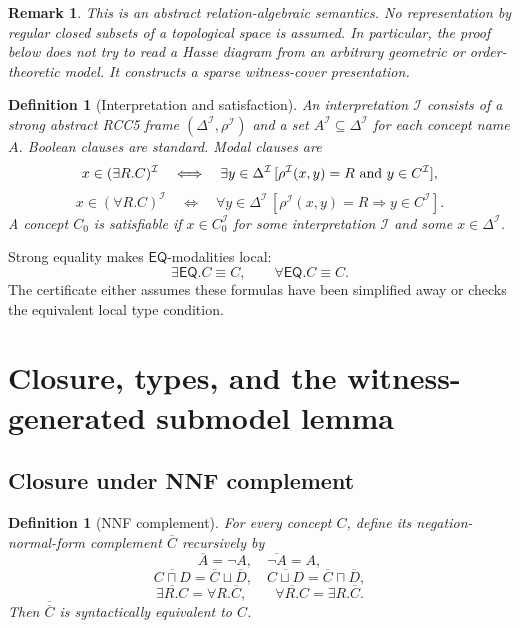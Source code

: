 \documentclass[11pt]{article}
\newtheorem{definition}[theorem]{Definition}
\newtheorem{remark}[theorem]{Remark}
\newcommand{\EQ}{\mathsf{EQ}}
\newcommand{\I}{\mathcal I}
\begin{document}
\begin{remark}
This is an abstract relation-algebraic semantics.  No representation by regular closed subsets of a topological space is assumed.  In particular, the proof below does not try to read a Hasse diagram from an arbitrary geometric or order-theoretic model.  It constructs a sparse witness-cover presentation.
\end{remark}

\begin{definition}[Interpretation and satisfaction]\label{def:satisfaction}
An interpretation $\I$ consists of a strong abstract RCC5 frame $(\Delta^\I,\rho^\I)$ and a set $A^\I\subseteq\Delta^\I$ for each concept name $A$.  Boolean clauses are standard.  Modal clauses are
\[
 x\in(\exists R.C)^\I
 \quad\Longleftrightarrow\quad
 \exists y\in\Delta^\I\,[\rho^\I(x,y)=R\hbox{ and }y\in C^\I],
\]
\[
 x\in(\forall R.C)^\I
 \quad\Longleftrightarrow\quad
 \forall y\in\Delta^\I\,[\rho^\I(x,y)=R\Rightarrow y\in C^\I].
\]
A concept $C_0$ is satisfiable if $x\in C_0^\I$ for some interpretation $\I$ and some $x\in\Delta^\I$.
\end{definition}

Strong equality makes $\EQ$-modalities local:
\[
  \exists\EQ.C\equiv C,
  \qquad
  \forall\EQ.C\equiv C.
\]
The certificate either assumes these formulas have been simplified away or checks the equivalent local type condition.

\section{Closure, types, and the witness-generated submodel lemma}

\subsection{Closure under NNF complement}

\begin{definition}[NNF complement]\label{def:nnfcomp}
For every concept $C$, define its negation-normal-form complement $\overline C$ recursively by
\[
\overline A=\neg A,
\quad
\overline{\neg A}=A,
\]
\[
\overline{C\sqcap D}=\overline C\sqcup\overline D,
\quad
\overline{C\sqcup D}=\overline C\sqcap\overline D,
\]
\[
\overline{\exists R.C}=\forall R.\overline C,
\qquad
\overline{\forall R.C}=\exists R.\overline C.
\]
Then $\overline{\overline C}$ is syntactically equivalent to $C$.
\end{definition}
\end{document}
